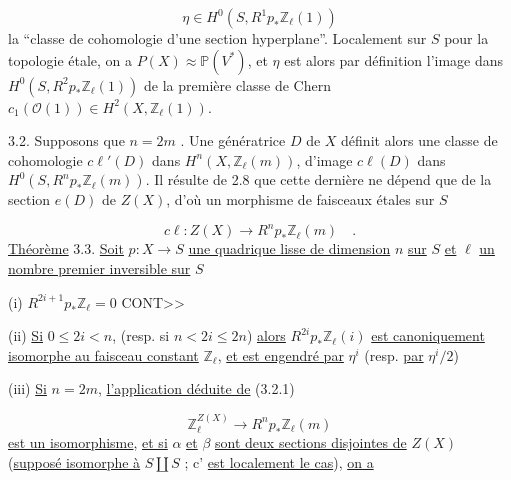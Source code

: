 \begin{equation*}
\eta \in H^0(S, R^1 p_* \mathbb{Z}_\ell(1))
\end{equation*}
la ``classe de cohomologie d'une section hyperplane''. Localement sur $S$ pour la topologie étale, on a $P(X) \approx \mathbb{P}(V^*)$, et $\eta$ est alors par définition l'image dans $H^0(S, R^2 p_* \mathbb{Z}_\ell(1))$ de la première classe de Chern $c_1(\mathcal{O}(1)) \in H^2(X, \mathbb{Z}_\ell(1))$.

3.2. Supposons que $n = 2m$ . Une génératrice $D$ de $X$ définit alors une classe de cohomologie $c\ell'(D)$ dans $H^n(X, \mathbb{Z}_\ell(m))$, d'image $c\ell(D)$ dans $H^0(S,R^n p_* \mathbb{Z}_\ell(m))$. Il résulte de 2.8 que cette dernière ne dépend que de la section $e(D)$ de $Z(X)$, d'où un morphisme de faisceaux étales sur $S$

\begin{equation}\tag{3.2.1}
c\ell : Z(X) \longrightarrow R^n p_* \mathbb{Z}_\ell(m) \quad .
\end{equation}
\underline{Théorème} 3.3. \underline{Soit} $p : X \longrightarrow S$ \underline{une quadrique lisse de dimension} $n$ \underline{sur} $S$ \underline{et} $\ell$ \underline{un nombre premier inversible sur} $S$

(i) \quad $R^{2i+1} p_* \mathbb{Z}_\ell = 0$ CONT>>



(ii) \underline{Si} $0 \leqslant 2i < n$, (resp. si $n< 2i \leqslant 2n$) \underline{alors} $R^{2i}p_{*} \mathbb{Z}_{\ell}(i)$ \underline{est canoniquement isomorphe au faisceau constant} $\mathbb{Z}_{\ell}$, \underline{et est engendré par} $\eta^{i}$ (resp. \underline{par} $\eta^{i}/2$)

(iii) \underline{Si} $n = 2m$, \underline{l'application déduite de} (3.2.1)

\begin{equation}\tag{3.2.1}
\mathbb{Z}_{\ell}^{Z(X)} \longrightarrow R^{n}p_{*} \mathbb{Z}_{\ell}(m)
\end{equation}
\underline{est un isomorphisme}, \underline{et si} $\alpha$ \underline{et} $\beta$ \underline{sont deux sections disjointes de} $Z(X)$ (\underline{supposé isomorphe à} $S \amalg S$ ; c' \underline{est localement le cas}), \underline{on a}

